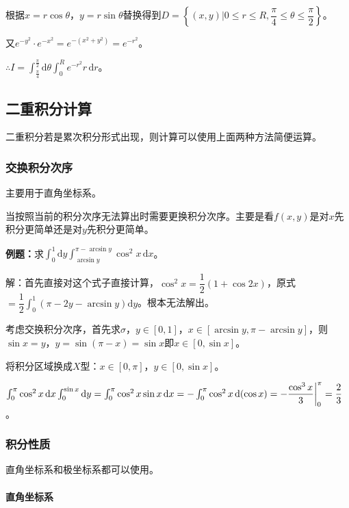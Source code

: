 \documentclass[UTF8, 12pt]{ctexart}
\begin{document}
根据$x=r\cos\theta$，$y=r\sin\theta$替换得到$D=\left\{(x,y)\bigg|0\leqslant r\leqslant R,\dfrac{\pi}{4}\leqslant\theta\leqslant\dfrac{\pi}{2}\right\}$。

又$e^{-y^2}\cdot e^{-x^2}=e^{-(x^2+y^2)}=e^{-r^2}$。

$\therefore I=\int_{\frac{\pi}{4}}^{\frac{\pi}{2}}\textrm{d}\theta\int_0^Re^{-r^2}r\,\textrm{d}r$。

\subsection{二重积分计算}

二重积分若是累次积分形式出现，则计算可以使用上面两种方法简便运算。

\subsubsection{交换积分次序}

主要用于直角坐标系。

当按照当前的积分次序无法算出时需要更换积分次序。主要是看$f(x,y)$是对$x$先积分更简单还是对$y$先积分更简单。

\textbf{例题：}求$\int_0^1\textrm{d}y\int_{\arcsin y}^{\pi-\arcsin y}\cos^2x\,\textrm{d}x$。

解：首先直接对这个式子直接计算，$\cos^2x=\dfrac{1}{2}(1+\cos2x)$，原式$=\dfrac{1}{2}\int_0^1(\pi-2y-\arcsin y)\textrm{d}y$。根本无法解出。

考虑交换积分次序，首先求$\sigma$，$y\in[0,1]$，$x\in[\arcsin y,\pi-\arcsin y]$，则$\sin x=y$，$y=\sin(\pi-x)=\sin x$即$x\in[0,\sin x]$。

将积分区域换成$X$型：$x\in[0,\pi]$，$y\in[0,\sin x]$。

$\int_0^\pi\cos^2x\,\textrm{d}x\int_0^{\sin x}\textrm{d}y=\int_0^\pi\cos^2x\sin x\,\textrm{d}x=-\int_0^\pi\cos^2x\,\textrm{d}(\cos x)=-\dfrac{\cos^3x}{3}\bigg|_0^\pi\\=\dfrac{2}{3}$。

\subsubsection{积分性质}

直角坐标系和极坐标系都可以使用。

\paragraph{直角坐标系} \leavevmode \medskip
\end{document}
